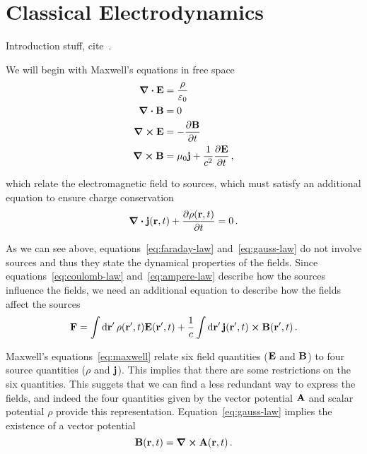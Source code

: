 \documentclass[12pt, class=report, crop=false]{standalone}
\begin{document}
\chapter{Classical Electrodynamics}%
\label{chap:classical-electrodynamics}

{\color{red} Introduction stuff, cite~\textcite{eisenberg_nucleartheory_1978,jackson_classicalelectrodynamics_1999}}.

We will begin with Maxwell's equations in free space
\begin{subequations}%
  \label{eq:maxwell}
  \begin{align}
    \div{\vb{E}} & = \frac{\rho}{\varepsilon_0} \label{eq:coulomb-law} \\
    \div{\vb{B}} & = 0 \label{eq:gauss-law} \\
    \curl{\vb{E}} & = - \pdv{\vb{B}}{t} \label{eq:faraday-law} \\
    \curl{\vb{B}} & = \mu_0 \vb{j} + \frac{1}{c^2} \pdv{\vb{E}}{t} \,, \label{eq:ampere-law}
  \end{align}
\end{subequations}

which relate the electromagnetic field to sources, which must satisfy an additional
equation to ensure charge conservation
\begin{equation}
  \label{eq:continuity-equation}
  \div{\vb{j}(\vb{r}, t)} + \pdv{\rho(\vb{r}, t)}{t} = 0 \,.
\end{equation}

As we can see above, equations~\eqref{eq:faraday-law} and~\eqref{eq:gauss-law}
do not involve sources and thus they state the dynamical properties of the fields.
Since equations~\eqref{eq:coulomb-law} and~\eqref{eq:ampere-law} describe how
the sources influence the fields, we need an additional equation to describe how
the fields affect the sources
\[
  \vb{F} = \int \dd{\vb{r}'} \rho(\vb{r}', t) \vb{E}(\vb{r}', t) +
           \frac{1}{c} \int \dd{\vb{r}'} \vb{j}(\vb{r}', t) \cross \vb{B}(\vb{r}', t)\,.
\]

Maxwell's equations~\eqref{eq:maxwell} relate six field quantities (\(\vb{E}\) and \(\vb{B}\))
to four source quantities (\(\rho\) and \(\vb{j}\)). This implies that there are some
restrictions on the six quantities. This suggets that we can find a less redundant
way to express the fields, and indeed the four quantities given by the
vector potential \(\vb{A}\) and scalar potential \(\rho\) provide this representation.
Equation~\eqref{eq:gauss-law} implies the existence of a vector potential
\begin{equation}
  \label{eq:vector-potential}
  \vb{B}(\vb{r}, t) = \curl{\vb{A}(\vb{r}, t)}\,.
\end{equation}
\end{document}
